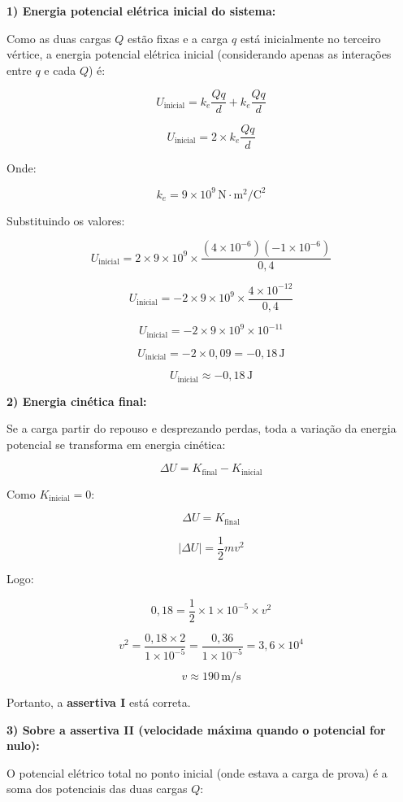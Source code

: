 \documentclass[a4paper,12pt]{article}
\begin{document}
\begin{flushleft}
\textbf{1) Energia potencial elétrica inicial do sistema:}

Como as duas cargas \( Q \) estão fixas e a carga \( q \) está inicialmente no terceiro vértice, a energia potencial elétrica inicial (considerando apenas as interações entre \( q \) e cada \( Q \)) é:

\[
U_{\text{inicial}} = k_e \frac{Qq}{d} + k_e \frac{Qq}{d}
\]

\[
U_{\text{inicial}} = 2 \times k_e \frac{Qq}{d}
\]

Onde:

\[
k_e = 9 \times 10^9\,\mathrm{N \cdot m^2/C^2}
\]

Substituindo os valores:

\[
U_{\text{inicial}} = 2 \times 9 \times 10^9 \times \frac{(4 \times 10^{-6})(-1 \times 10^{-6})}{0,4}
\]

\[
U_{\text{inicial}} = -2 \times 9 \times 10^9 \times \frac{4 \times 10^{-12}}{0,4}
\]

\[
U_{\text{inicial}} = -2 \times 9 \times 10^9 \times 10^{-11}
\]

\[
U_{\text{inicial}} = -2 \times 0,09 = -0,18\,\mathrm{J}
\]

\[
U_{\text{inicial}} \approx -0,18\,\mathrm{J}
\]

\textbf{2) Energia cinética final:}

Se a carga partir do repouso e desprezando perdas, toda a variação da energia potencial se transforma em energia cinética:

\[
\Delta U = K_{\text{final}} - K_{\text{inicial}}
\]

Como \( K_{\text{inicial}} = 0 \):

\[
\Delta U = K_{\text{final}}
\]

\[
|\Delta U| = \frac{1}{2} m v^2
\]

Logo:

\[
0,18 = \frac{1}{2} \times 1 \times 10^{-5} \times v^2
\]

\[
v^2 = \frac{0,18 \times 2}{1 \times 10^{-5}} = \frac{0,36}{1 \times 10^{-5}} = 3,6 \times 10^4
\]

\[
v \approx 190\,\mathrm{m/s}
\]

Portanto, a \textbf{assertiva I} está correta.

\textbf{3) Sobre a assertiva II (velocidade máxima quando o potencial for nulo):}

O potencial elétrico total no ponto inicial (onde estava a carga de prova) é a soma dos potenciais das duas cargas \( Q \):


\end{flushleft}
\end{document}
